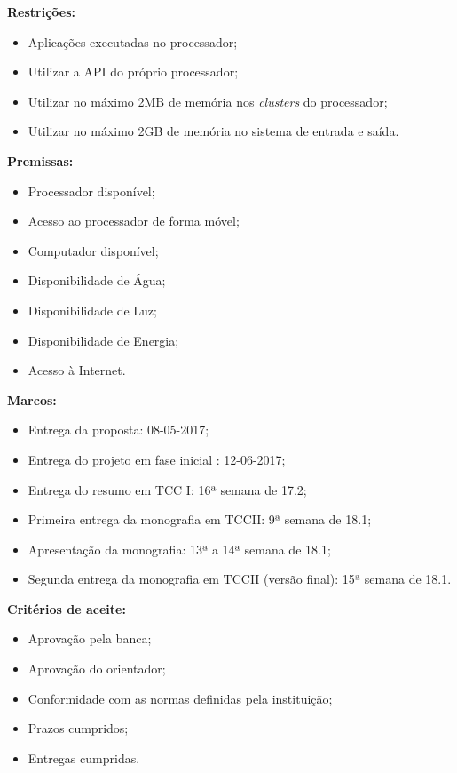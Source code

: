 \documentclass[
	12pt,				%
	openright,			%
	twoside,			%
	a4paper,			%
	english,			%
	brazil,				%
	]{abntex2}
\begin{document}
\begin{flushleft}
\textbf{Restrições:}
\begin{itemize}
\item Aplicações executadas no processador;
\item Utilizar a API do próprio processador;
\item Utilizar no máximo 2MB de memória nos \textit{clusters} do processador;
\item Utilizar no máximo 2GB de memória no sistema de entrada e saída.
\end{itemize}

\textbf{Premissas:}
\begin{itemize}
\item Processador disponível; 
\item Acesso ao processador de forma móvel; 
\item Computador disponível; 
\item Disponibilidade de Água; 
\item Disponibilidade de Luz; 
\item Disponibilidade de Energia; 
\item Acesso à Internet.
\end{itemize}

\textbf{Marcos:}
\begin{itemize}
\item Entrega da proposta: 08-05-2017; 
\item Entrega do projeto em fase inicial : 12-06-2017; 
\item Entrega do resumo em TCC I: 16ª semana de 17.2; 
\item Primeira entrega da monografia em TCCII: 9ª semana de 18.1; 
\item Apresentação da monografia: 13ª a 14ª semana de 18.1;
\item Segunda entrega da monografia em TCCII (versão final): 15ª semana de 18.1.

\end{itemize}
\textbf{Critérios de aceite:}
\begin{itemize}
\item Aprovação pela banca;
\item Aprovação do orientador;
\item Conformidade com as normas definidas pela instituição;
\item Prazos cumpridos;
\item Entregas cumpridas.
\end{itemize}
\end{flushleft}
\end{document}
